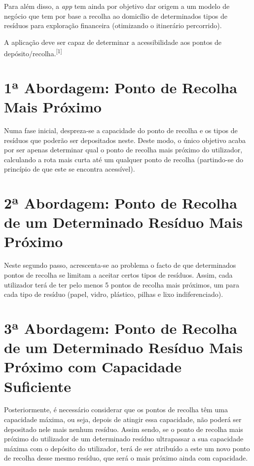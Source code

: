 \documentclass[article, a4paper, 12pt, oneside]{memoir}
\begin{document}
Para além disso, a \textit{app} tem ainda por objetivo dar origem a um modelo de negócio que tem por base a recolha ao domicílio de determinados tipos de resíduos para exploração financeira (otimizando o itinerário percorrido).

A aplicação deve ser capaz de determinar a acessibilidade aos pontos de depósito/recolha.\textsuperscript{[1]}

\section[1ª Abordagem: Ponto de Recolha Mais Próximo][1ª Abordagem: Ponto de Recolha Mais Próximo]{1ª Abordagem: Ponto de Recolha Mais Próximo} \label{\thesection}
	
	Numa fase inicial, despreza-se a capacidade do ponto de recolha e os tipos de resíduos que poderão ser depositados neste. Deste modo, o único objetivo acaba por ser apenas determinar qual o ponto de recolha mais próximo do utilizador, calculando a rota mais curta até um qualquer ponto de recolha (partindo-se do princípio de que este se encontra acessível).

\section[2ª Abordagem: Ponto de Recolha de um Determinado Resíduo Mais Próximo][2ª Abordagem: Ponto de Recolha de um Determinado Resíduo Mais Próximo]{2ª Abordagem: Ponto de Recolha de um Determinado Resíduo Mais Próximo} \label{\thesection}
	
	Neste segundo passo, acrescenta-se ao problema o facto de que determinados pontos de recolha se limitam a aceitar certos tipos de resíduos. Assim, cada utilizador terá de ter pelo menos 5 pontos de recolha mais próximos, um para cada tipo de resíduo (papel, vidro, plástico, pilhas e lixo indiferenciado).	


\section[3ª Abordagem: Ponto de Recolha de um Determinado Resíduo Mais Próximo com Capacidade Suficiente][3ª Abordagem: Ponto de Recolha de um Determinado Resíduo Mais Próximo com Capacidade Suficiente]{3ª Abordagem: Ponto de Recolha de um Determinado Resíduo Mais Próximo com Capacidade Suficiente} \label{\thesection}

	
	Posteriormente, é necessário considerar que os pontos de recolha têm uma capacidade máxima, ou seja, depois de atingir essa capacidade, não poderá ser depositado nele mais nenhum resíduo. Assim sendo, se o ponto de recolha mais próximo do utilizador de um determinado resíduo ultrapassar a sua capacidade máxima com o depósito do utilizador, terá de ser atribuído a este um novo ponto de recolha desse mesmo resíduo, que será o mais próximo ainda com capacidade.
\end{document}
